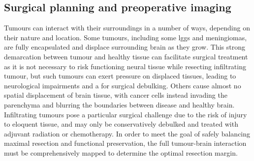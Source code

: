 
\subsection{Surgical planning and preoperative imaging}

Tumours can interact with their surroundings in a number of ways, depending on their nature and location.
Some tumours, including some \glspl{lgg} and meningiomas, are fully encapsulated and displace surrounding brain as they grow.
This strong demarcation between tumour and healthy tissue can facilitate surgical treatment as it is not necessary to risk functioning neural tissue while resecting infiltrating tumour, but such tumours can exert pressure on displaced tissues, leading to neurological impairments and a  for surgical debulking.
Others cause almost no spatial displacement of brain tissue, with cancer cells instead invading the parenchyma and blurring the boundaries between disease and healthy brain.
Infiltrating tumours pose a particular surgical challenge due to the risk of injury to eloquent tissue, and may only be conservatively debulked and treated with adjuvant radiation or chemotherapy.
In order to meet the goal of safely balancing maximal resection and functional preservation, the full tumour-brain interaction must be comprehensively mapped to determine the optimal resection margin.


